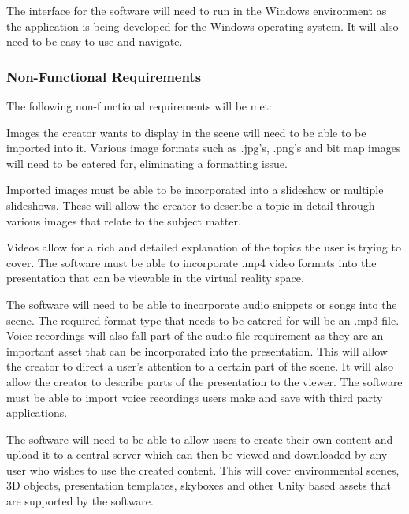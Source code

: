 \begin{flushleft}

		The interface for the software will need to run in the Windows environment as the application is being developed for the Windows operating system.
		It will also need to be easy to use and navigate.

	\subsubsection{Non-Functional Requirements}

	The following non-functional requirements will be met:


		Images the creator wants to display in the scene will need to be able to be imported into it.
		Various image formats such as .jpg's, .png's and bit map images will need to be catered for, eliminating a formatting issue.


		Imported images must be able to be incorporated into a slideshow or multiple slideshows.
		These will allow the creator to describe a topic in detail through various images that relate to the subject matter.


		Videos allow for a rich and detailed explanation of the topics the user is trying to cover.
		The software must be able to incorporate .mp4 video formats into the presentation that can be viewable in the virtual reality space.


		The software will need to be able to incorporate audio snippets or songs into the scene.
		The required format type that needs to be catered for will be an .mp3 file.
		Voice recordings will also fall part of the audio file requirement as they are an important asset that can be incorporated into the presentation.
		This will allow the creator to direct a user’s attention to a certain part of the scene.
		It will also allow the creator to describe parts of the presentation to the viewer.
		The software must be able to import voice recordings users make and save with third party applications.


		The software will need to be able to allow users to create their own content and upload it to a central server which can then be viewed and downloaded by any user who wishes to use the created content.
		This will cover environmental scenes, 3D objects, presentation templates, skyboxes and other Unity based assets that are supported by the software.


\end{flushleft}
